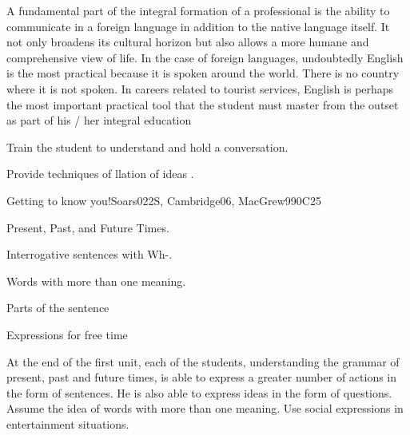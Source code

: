 \begin{syllabus}


\begin{justification}
A fundamental part of the integral formation of a professional is the ability to communicate in a foreign language in addition to the native language itself.
It not only broadens its cultural horizon but also allows a more humane and comprehensive view of life. In the case of foreign languages, undoubtedly English is the most practical because it is spoken around the world. There is no country where it is not spoken. In careers related to tourist services, English is perhaps the most important practical tool that the student must master from the outset as part of his / her integral education

\end{justification}

\begin{goals}
\item Train the student to understand and hold a conversation.
\item Provide techniques of llation of ideas .
\end{goals}

\begin{outcomes}
\item {}
\end{outcomes}

\begin{competences}
\item {}
\end{competences}

\begin{unit}{Getting to know you!}{}{Soars022S, Cambridge06, MacGrew99}{0}{C25}
   \begin{topics}
      \item Present, Past, and Future Times.
      \item Interrogative sentences with Wh-.
      \item Words with more than one meaning.
      \item Parts of the sentence
      \item Expressions for free time
   \end{topics}

   \begin{learningoutcomes}
      \item At the end of the first unit, each of the students, understanding the grammar of present, past and future times, is able to express a greater number of actions in the form of sentences. He is also able to express ideas in the form of questions.
            Assume the idea of words with more than one meaning. Use social expressions in entertainment situations. 
   \end{learningoutcomes}
\end{unit}


\end{syllabus}
